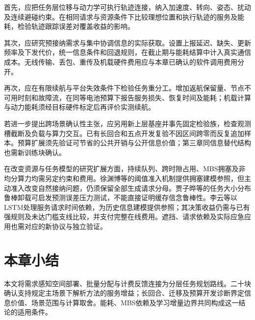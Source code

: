 首先，应把任务层位移与动力学可执行轨迹连接，纳入加速度、转向、姿态、扰动及连续避碰约束。在相同请求与资源条件下比较理想位置和执行轨迹的服务及能耗，检验轨迹跟踪误差对覆盖收益的影响。

其次，应研究预接纳需求与集中协调信息的实际获取。设置上报延迟、缺失、更新频率及下发代价，统一信息条件和回退规则，在截止期与能耗结算中计入真实通信成本。无线传输、丢包、重传及机载硬件费用应与本章已确认的软件调用费用分开。

再次，应在有限续航与平台失效条件下检验任务重分工。增加返航保留量、节点不可用时刻和故障流，在同等电池预算下报告服务损失、恢复时间及能耗；机载计算与动力能耗须经目标硬件标定后再评价实测续航。

若进一步提出跨场景确认性主张，应另用新上层基座并事先固定检验族，检查观测槽截断及负载与算力交互。已有长回合和五点开发复验不因区间跨零而反复追加样本。预算扩展须先验证可节省的公共开销与公开信息价值；第三章同信息替代结构也需新训练块确认。

在改变资源与任务模型的研究扩展方面，持续队列、跨时隙占用、MBS拥塞及非均分算力均需另定约束和费用。徐渊博等的阈值准入机制\cite{xu2025admission}提供拥塞建模参照，但主动准入改变自然接纳问题，仍须保留全部生成请求分母。贾子晔等的任务大小分布鲁棒卸载\cite{jia2025robust}可启发预测误差压力测试，不能直接证明缓存信念鲁棒性。李云等以LSTM处理服务请求时间依赖\cite{li2023arrangement}，为历史信息建模提供参照；其决策收益仍需与已有强规则及未达门槛支线比较，并支付完整在线费用。遮挡、请求依赖及实际应急应用也需对应的新协议与独立验证。

\section{本章小结}
\label{sec:ch6-closing}

本文将需求感知空间部署、批量分配与计费反馈连接为分层任务规划路线。二十块确认支持规定主场景下解析方法的服务增益；长回合、迁移及预算开发诊断界定信息价值、场景范围与计算取舍。能耗、MBS依赖及学习增量边界共同构成这一结论的适用条件。
